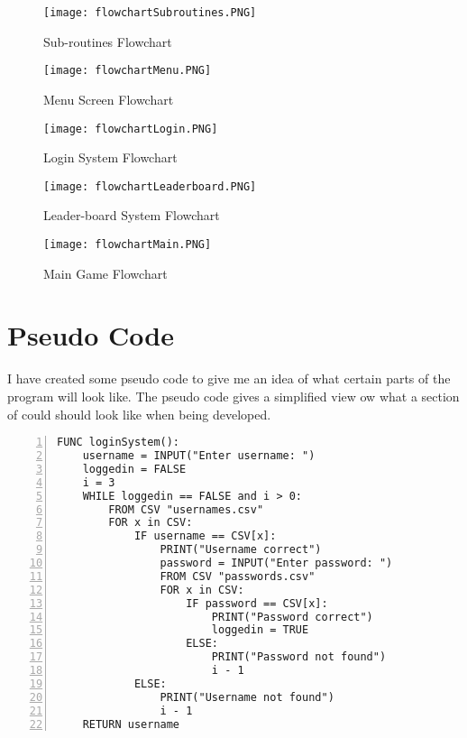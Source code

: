 \documentclass[12pt]{report}
\begin{document}
\pagebreak

\begin{figure}[H]
    \centering
    \texttt{[image: flowchartSubroutines.PNG]}
    \caption{Sub-routines Flowchart}
    \label{flowc1}
\end{figure}

\begin{figure}[H]
    \centering
    \texttt{[image: flowchartMenu.PNG]}
    \caption{Menu Screen Flowchart}
    \label{flowc2}
\end{figure}

\begin{figure}[H]
    \centering
    \texttt{[image: flowchartLogin.PNG]}
    \caption{Login System Flowchart}
    \label{flowc3}
\end{figure}

\begin{figure}[H]
    \centering
    \texttt{[image: flowchartLeaderboard.PNG]}
    \caption{Leader-board System Flowchart}
    \label{flowc4}
\end{figure}

\begin{figure}[H]
    \centering
    \texttt{[image: flowchartMain.PNG]}
    \caption{Main Game Flowchart}
    \label{flowc6}
\end{figure}

\pagebreak

\section{Pseudo Code}
I have created some pseudo code to give me an idea of what certain parts of the program will look like. The pseudo code gives a simplified view ow what a section of could should look like when being developed.

\begin{Verbatim}[numbers=left, frame=single]
FUNC loginSystem():
    username = INPUT("Enter username: ")
    loggedin = FALSE
    i = 3
    WHILE loggedin == FALSE and i > 0:
        FROM CSV "usernames.csv"
        FOR x in CSV:
            IF username == CSV[x]:
                PRINT("Username correct")
                password = INPUT("Enter password: ")
                FROM CSV "passwords.csv"
                FOR x in CSV:
                    IF password == CSV[x]:
                        PRINT("Password correct")
                        loggedin = TRUE
                    ELSE:
                        PRINT("Password not found")
                        i - 1
            ELSE:
                PRINT("Username not found")
                i - 1
    RETURN username
\end{Verbatim}
\end{document}
